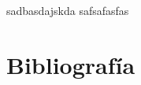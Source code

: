 \documentclass[12pt,a4paper]{article}
\begin{document}
	sadbasdajskda \cite{LS650}
	safsafasfas \cite{airecalculo}
	\section{Bibliografía}
\printbibliography
\newpage

 \begin{comment}

https://mauricioanderson.com/curso-latex-referencias-bibliografia-bibtex/ ver esto
\begin{thebibliography}{0}
	\bibitem{TunelUNPSJB} http://www.ing.unp.edu.ar/mecanica/Paginas/Tunel.htm.
	\bibitem{Luckie2010} Matthew Luckie. CScamper: a scalable, extensible packet 
	prober for active measurement of the internet, 2010.
\end{thebibliography}
\newpage
\part{Anexos}

\end{comment}
\end{document}
